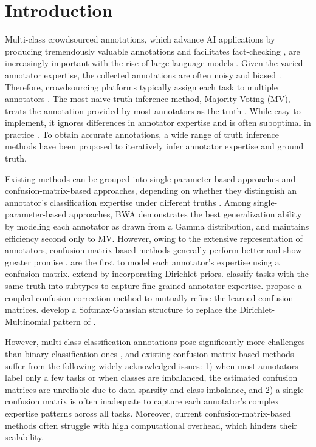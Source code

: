 \documentclass[letterpaper]{article} %
\begin{document}
\section{Introduction}
Multi-class crowdsourced annotations, which advance AI applications by producing tremendously valuable annotations and facilitates fact-checking \cite{Li24,Otanietal23,Chenetal22}, are increasingly important with the rise of large language models \cite{yao2024a,Gienappetal25}. Given the varied annotator expertise, the collected annotations are often noisy and biased \cite{HubeFG19,Lietal2019a}. Therefore, crowdsourcing platforms typically assign each task to multiple annotators \cite{Sheng19,Wallaceetal22}. The most naive truth inference method, Majority Voting (MV), treats the annotation provided by most annotators as the truth \cite{Li14}. While easy to implement, it ignores differences in annotator expertise and is often suboptimal in practice \cite{Hornetal18}. To obtain accurate annotations, a wide range of truth inference methods have been proposed to iteratively infer annotator expertise and ground truth.

Existing methods can be grouped into single-parameter-based approaches and confusion-matrix-based approaches, depending on whether they distinguish an annotator's classification expertise under different truths \cite{Chenetal25}. Among single-parameter-based approaches, BWA \cite{Lietal2019b} demonstrates the best generalization ability by modeling each annotator as drawn from a Gamma distribution, and maintains efficiency second only to MV. However, owing to the extensive representation of annotators, confusion-matrix-based methods generally perform better and show greater promise \cite{Zhangetal24}. \citet{DawidSkene1979} are the first to model each annotator's expertise using a confusion matrix. \citet{KimGhahramani2012} extend \cite{DawidSkene1979} by incorporating Dirichlet priors. \citet{Lietal2019a} classify tasks with the same truth into subtypes to capture fine-grained annotator expertise. \citet{Zhangetal24} propose a coupled confusion correction method to mutually refine the learned confusion matrices. \citet{Chenetal25} develop a Softmax-Gaussian structure to replace the Dirichlet-Multinomial pattern of \citet{KimGhahramani2012}.

However, multi-class classification annotations pose significantly more challenges than binary classification ones \cite{Chu21a,Yangetal24,Zhangetal25}, and existing confusion-matrix-based methods suffer from the following widely acknowledged issues: 1) when most annotators label only a few tasks or when classes are imbalanced, the estimated confusion matrices are unreliable due to data sparsity and class imbalance, and 2) a single confusion matrix is often inadequate to capture each annotator's complex expertise patterns across all tasks. Moreover, current confusion-matrix-based methods often struggle with high computational overhead, which hinders their scalability.
\end{document}
